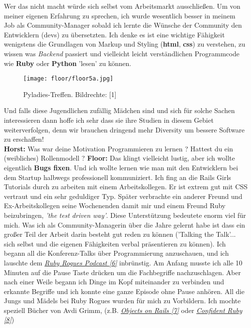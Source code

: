 \documentclass[10pt,a4paper,ngerman,twoside]{article} %
\begin{document}
Wer das nicht macht würde sich selbst vom Arbeitsmarkt ausschließen. Um von meiner eigenen Erfahrung zu sprechen, ich wurde wesentlich besser in meinem Job als Community-Manager sobald ich lernte die Wünsche der Community den Entwicklern (devs) zu übersetzten. Ich denke es ist eine  wichtige Fähigkeit wenigstens die Grundlagen von Markup und Styling (\textbf{html}, \textbf{css}) zu verstehen, zu wissen was \textit{Backend} passiert und vielleicht leicht verständlichen Programmcode wie \textbf{Ruby} oder \textbf{Python} 'lesen' zu können. 
\begin{figure}
\texttt{[image: floor/floor5a.jpg]} \\
\caption{Pyladies-Treffen. Bildrechte: [1]} 
\end{figure}
Und falls diese Jugendlichen zufällig Mädchen sind und sich für solche Sachen interessieren dann hoffe ich sehr dass sie ihre Studien in diesem Gebiet weiterverfolgen, denn wir brauchen dringend mehr Diversity um bessere Software zu erschaffen! \\
\textbf{Horst:} Was war deine Motivation Programmieren zu lernen ? Hattest du ein (weibliches) Rollenmodell ?
\textbf{Floor:} Das klingt vielleicht lustig, aber ich wollte eigentlich \textbf{Bugs fixen}. Und ich wollte lernen wie man mit den Entwicklern bei dem Startup halbwegs professionell kommuniziert. 
Ich fing an die Rails Girls Tutorials durch zu arbeiten mit einem Arbeitskollegen. Er ist extrem gut mit CSS vertraut und ein sehr geduldiger Typ. Später verbrachte ein anderer Freund und Ex-Arbeitskollegen seine Wochenenden damit mir und einem Freund Ruby beizubringen, \textit{'the test driven way'}. Diese Unterstützung bedeutete enorm viel für mich.
Was ich als Community-Managerin über die Jahre gelernt habe ist dass ein großer Teil der Arbeit darin besteht gut reden zu können ('Talking the Talk'... sich selbst und die eigenen Fähigkeiten verbal präsentieren zu können). Ich begann all die Konferenz-Talks über Programmierung anzuschauen, und ich lauschte dem \href{http://rubyrogues.com/}{\textit{Ruby Rogues Podcast [6]}} inbrünstig. Am Anfang musste ich alle 10 Minuten auf die Pause Taste drücken um die Fachbegriffe nachzuschlagen. Aber nach einer Weile begann ich Dinge im Kopf miteinander zu verbinden und erkannte Begriffe und ich konnte eine ganze Episode ohne Pause anhören. 
All die Jungs und Mädels bei Ruby Rogues wurden für mich zu Vorbildern. Ich mochte speziell Bücher von  Avdi Grimm, (z.B. \href{http://objectsonrails.com/}{\textit{Objects on Rails [7]}} oder \href{http://www.confidentruby.com/}{\textit{Confident Ruby [8]}}) 
\end{document}
